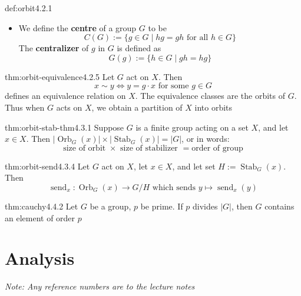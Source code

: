 \documentclass[landscape, 8pt]{extarticle}
\DeclareMathOperator{\Orb}{Orb}
\DeclareMathOperator{\Stab}{Stab}
\DeclareMathOperator{\send}{send}
\begin{document}
\begin{multicols}{3}
\begin{dfn}{def:orbit}{4.2.1}
\begin{itemize}
        \item We define the \textbf{centre} of a group $G$ to be
        \[C(G):=\{g\in G\mid hg=gh \text{ for all } h\in G\}\]
        The \textbf{centralizer} of $g$ in $G$ is defined as
        \[G(g):=\{h\in G\mid gh=hg\}\]
    \end{itemize}
\end{dfn}
\vspace{-5pt}

\begin{thm}{thm:orbit-equivalence}{4.2.5}
Let $G$ act on $X$. Then
\[x\sim y \iff y = g\cdot x \text{ for some } g\in G\]
defines an equivalence relation on $X$. The equivalence classes are the orbits of $G$. Thus when $G$ acts on $X$, we obtain a partition of $X$ into orbits
\end{thm}
\vspace{-5pt}

\begin{thm}{thm:orbit-stab-thm}{4.3.1}
Suppose $G$ is a finite group acting on a set $X$, and let $x\in X$. Then $\lvert \Orb_{G}(x)\rvert \times \lvert \Stab_{G}(x)\rvert = \lvert G\rvert$, or in words:
\[\text{size of orbit } \times \text{ size of stabilizer } = \text{order of group}\]
\end{thm}
\vspace{-5pt}

\begin{thm}{thm:orbit-send}{4.3.4}
Let $G$ act on $X$, let $x \in X$, and let set $H:= \Stab_{G}(x)$. Then
$$\send_{x}: \Orb_{G}(x)\to G/H \text{ which sends } y\mapsto \send_{x}(y)$$
\end{thm}
\vspace{-5pt}

\begin{thm}{thm:cauchy}{4.4.2}
Let $G$ be a group, $p$ be prime. If $p$ divides $\lvert G\rvert $, then $G$ contains an element of order $p$
\end{thm}
\vspace{-5pt}
\newpage


\section{\huge Analysis}
\textit{Note: Any reference numbers are to the lecture notes}
\vspace{-5pt}

\end{multicols}
\end{document}
